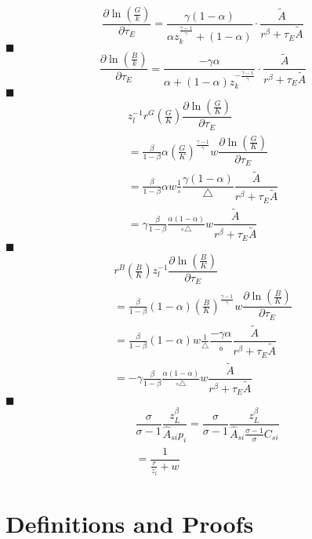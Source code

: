\documentclass[12pt]{article} %
\begin{document}
\begin{equation*}
        \frac{\partial \ln \left(\frac{G}{k}\right)}{\partial \tau_E}=\frac{\gamma(1-\alpha)}{\alpha z_k^{\frac{\gamma-1}{\gamma}}+(1-\alpha)} \cdot \frac{\tilde{A}}{r^\beta+\tau_E \tilde{A}}	
\end{equation*}$\blacksquare$
\begin{equation*}
    \frac{\partial \ln \left(\frac{B}{k}\right)}{\partial \tau_E} = \frac{-\gamma\alpha}{\alpha +(1-\alpha)z_k^{-\frac{\gamma-1}{\gamma}}} \cdot \frac{\tilde{A}}{r^\beta+\tau_E \tilde{A}}	
\end{equation*}$\blacksquare$
\begin{eqnarray*}
    z_l^{-1}r^G (\frac{G}{K})\dfrac{ \partial \ln (\frac{G}{K}) }{\partial \tau_E} \\
   =\frac{\beta}{1-\beta}{\alpha} (\frac{G}{K})^{\frac{\gamma-1}{\gamma}}{w} \dfrac{ \partial \ln (\frac{G}{K}) }{\partial \tau_E} \\
   =\frac{\beta}{1-\beta}{\alpha}w \frac{1}{\circ}\dfrac{\gamma (1-\alpha)}{\triangle}\dfrac{\tilde{A}}{r^\beta+\tau_E \tilde{A}}\\
   = \gamma \frac{\beta}{1-\beta}\frac{\alpha(1-\alpha)}{\circ\triangle}w\dfrac{\tilde{A}}{r^\beta+\tau_E \tilde{A}} 
\end{eqnarray*}$\blacksquare$	
\begin{eqnarray*}
    r^B (\frac{B}{K})z_l^{-1}\dfrac{ \partial \ln (\frac{B}{K}) }{\partial \tau_E} \\
    = \frac{\beta}{1-\beta}{(1-\alpha)}(\frac{B}{K})^{\frac{\gamma-1}{\gamma}}w \dfrac{ \partial \ln (\frac{B}{K}) }{\partial \tau_E} \\ 
    = \frac{\beta}{1-\beta}{(1-\alpha)}w  \frac{1}{\triangle}\dfrac{-\gamma \alpha}{\circ}\dfrac{\tilde{A}}{r^\beta+\tau_E \tilde{A}}\\
    = -\gamma \frac{\beta}{1-\beta}\frac{\alpha(1-\alpha)}{\circ\triangle}w\dfrac{\tilde{A}}{r^\beta+\tau_E \tilde{A}}
\end{eqnarray*} $\blacksquare$
\begin{eqnarray*}
    &\dfrac{\sigma}{\sigma -1}\dfrac{z_L^{\beta}}{{\hat{A}_{si}}p_i} = \dfrac{\sigma}{\sigma -1} \dfrac{z_L^{\beta}}{\hat{A}_{si}\frac{\sigma -1}{\sigma} C_{si}}\\
    & = \dfrac{1}{\frac{r}{z_l} + w}
\end{eqnarray*}

\section{Definitions and Proofs} 
\end{document}
